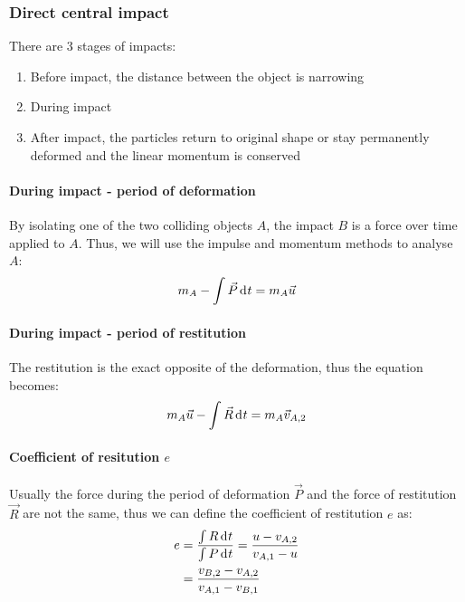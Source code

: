 \documentclass[10pt, twocolumn]{article}
\begin{document}
\subsubsection{Direct central impact}
There are 3 stages of impacts:
\begin{enumerate}
  \item Before impact, the distance between the object is narrowing
  \item During impact
  \item After impact, the particles return to original shape or stay permanently deformed and the linear momentum is conserved
\end{enumerate}


\paragraph{During impact - period of deformation}
By isolating one of the two colliding objects \(A\), the impact \(B\) is a force over time applied to \(A\).
Thus, we will use the impulse and momentum methods to analyse \(A\):
\[
  m_A - \int{\vec{P} \,\mathrm{d}^{} t} = m_A \vec{u}
\]


\paragraph{During impact - period of restitution}
The restitution is the exact opposite of the deformation, thus the equation becomes:
\[
  m_A \vec{u} - \int{\vec{R} \,\mathrm{d}^{} t} = m_A \vec{v}_{A,2}
\]


\paragraph{Coefficient of resitution \(e\)}
Usually the force during the period of deformation \(\vec{P}\) and the force of restitution \(\vec{R}\) are not the same, thus we can define the coefficient of restitution \(e\) as:
\[
  \begin{split}
    e & = \frac{\int{R \,\mathrm{d}^{} t}}{\int{P \,\mathrm{d}^{} t}} = \frac{u - v_{A,2}}{v_{A,1} - u} \\
    & = \frac{v_{B,2} - v_{A,2}}{v_{A,1} - v_{B,1}}
  \end{split}
\]
\end{document}
